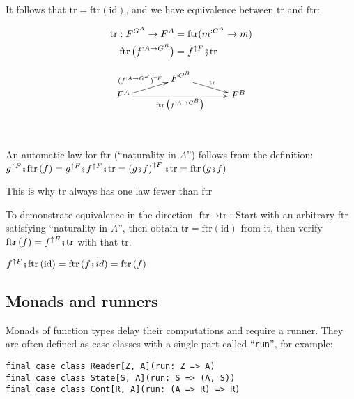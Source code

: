 It follows that $\text{tr}=\text{ftr}\left(\text{id}\right)$, and
we have equivalence between $\text{tr}$ and $\text{ftr}$: %
\begin{minipage}[c][1\totalheight][t]{0.4\columnwidth}%
\begin{align*}
\text{tr}:F^{G^{A}}\rightarrow F^{A} & =\text{ftr}(m^{:G^{A}}\rightarrow m)\\
\text{ftr}\,\big(f^{:A\rightarrow G^{B}}\big) & =f^{\uparrow F}\bef\text{tr}
\end{align*}
%
\end{minipage}\hfill{}%
\begin{minipage}[c][1\totalheight][t]{0.4\columnwidth}%
\[
\xymatrix{\xyScaleY{0.2pc}\xyScaleX{3pc} & F^{G^{B}}\ar[rd]\sp(0.5){\ \text{tr}\ }\\
F^{A}\ar[ru]\sp(0.5){(f^{:A\rightarrow G^{B}})^{\uparrow F}~\ }\ar[rr]\sb(0.5){\text{ftr}\,\big(f^{:A\rightarrow G^{B}}\big)\,} &  & F^{B}
}
\]
%
\end{minipage}\  \  \ \hfill{}

An automatic law for $\text{ftr}$ (\textsf{``}naturality in $A$\textsf{''}) follows
from the definition: $g^{\uparrow F}\bef\text{ftr}\left(f\right)=g^{\uparrow F}\bef f^{\uparrow F}\bef\text{tr}=\left(g\bef f\right)^{\uparrow F}\bef\text{tr}=\text{ftr}\left(g\bef f\right)$ 

This is why $\text{tr}$ always has one law fewer than $\text{ftr}$

To demonstrate equivalence in the direction $\text{ftr}\rightarrow\text{tr}$:
Start with an arbitrary $\text{ftr}$ satisfying \textsf{``}naturality in
$A$\textsf{''}, then obtain $\text{tr}=\text{ftr}\left(\text{id}\right)$
from it, then verify $\text{ftr}\left(f\right)=f^{\uparrow F}\bef\text{tr}$
with that $\text{tr}$.

$f^{\uparrow F}\bef\text{ftr}\left(\text{id}\right)=\text{ftr}\left(f\bef id\right)=\text{ftr}\left(f\right)$

\subsection{Monads and runners}

Monads of function types delay their computations and require a runner.
They are often defined as case classes with a single part called \textsf{``}\lstinline!run!\textsf{''},
for example:
\begin{lstlisting}
final case class Reader[Z, A](run: Z => A)
final case class State[S, A](run: S => (A, S))
final case class Cont[R, A](run: (A => R) => R)
\end{lstlisting}

